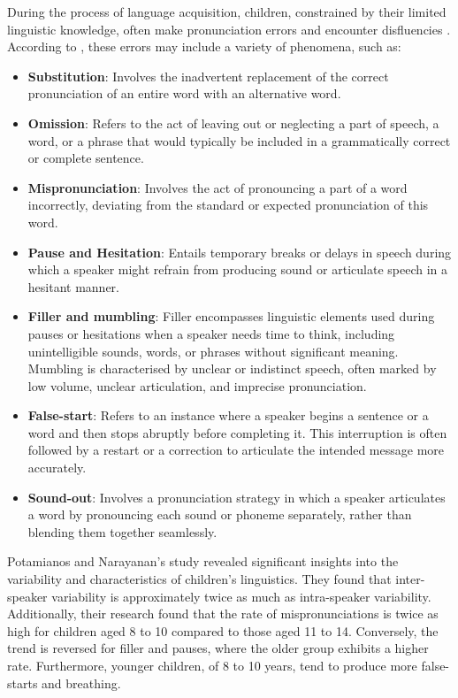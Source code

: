 During the process of language acquisition, children, constrained by their limited linguistic knowledge, often make pronunciation errors and encounter disfluencies \cite{language_children}. According to \cite{clark1977psychology}, these errors may include a variety of phenomena, such as:
\begin{itemize}
    \item \textbf{Substitution}:  Involves the inadvertent replacement of the correct pronunciation of an entire word with an alternative word.
    \item \textbf{Omission}:  Refers to the act of leaving out or neglecting a part of speech, a word, or a phrase that would typically be included in a grammatically correct or complete sentence.
    \item \textbf{Mispronunciation}:  Involves the act of pronouncing a part of a word incorrectly, deviating from the standard or expected pronunciation of this word.
    \item \textbf{Pause and Hesitation}: Entails temporary breaks or delays in speech during which a speaker might refrain from producing sound or articulate speech in a hesitant manner.
    \item \textbf{Filler and mumbling}:  Filler encompasses linguistic elements used during pauses or hesitations when a speaker needs time to think, including unintelligible sounds, words, or phrases without significant meaning. Mumbling is characterised by unclear or indistinct speech, often marked by low volume, unclear articulation, and imprecise pronunciation.
    \item \textbf{False-start}:  Refers to an instance where a speaker begins a sentence or a word and then stops abruptly before completing it. This interruption is often followed by a restart or a correction to articulate the intended message more accurately.
    \item \textbf{Sound-out}: Involves a pronunciation strategy in which a speaker articulates a word by pronouncing each sound or phoneme separately, rather than blending them together seamlessly.
\end{itemize}

Potamianos and Narayanan's study \cite{language_children2} revealed significant insights into the variability and characteristics of children's linguistics. They found that inter-speaker variability is approximately twice as much as intra-speaker variability. Additionally, their research found that the rate of mispronunciations is twice as high for children aged 8 to 10 compared to those aged 11 to 14. Conversely, the trend is reversed for filler and pauses, where the older group exhibits a higher rate. Furthermore, younger children, of 8 to 10 years, tend to produce more false-starts and breathing.

